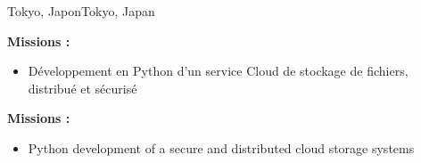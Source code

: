 {}{}{\ifnativelang Tokyo, Japon\else Tokyo, Japan\fi}{
\ifnativelang
	\textcolor{color1}{\textbf{Missions :}}
	\begin{itemize}[leftmargin=\ListItemsMargins]
		\item D\'eveloppement en Python d'un service Cloud de stockage de fichiers, distribu\'e et s\'ecuris\'e
	\end{itemize}
\else
	\textcolor{color1}{\textbf{Missions :}}
	\begin{itemize}[leftmargin=\ListItemsMargins]
		\item Python development of a secure and distributed cloud storage systems
	\end{itemize}
\fi
}

\vspace{\ItemsMaxSpacing}

